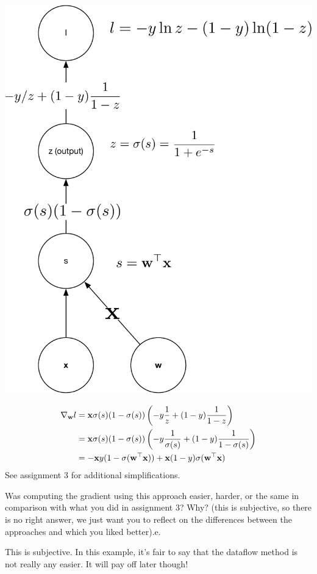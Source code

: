 \documentclass[assignment06_Solutions]{subfiles}
\begin{document}
\begin{exercise}[(30 minutes)]
\begin{boxedsolution}
\begin{center}
\includegraphics[width=0.8\linewidth]{figures/4bsolution}
\end{center}
\begin{align}
\nabla_{\mathbf{w}} l &= \mathbf{x} \sigma(s)(1-\sigma(s))\left(-y\frac{1}{z} + (1-y)\frac{1}{1-z}\right) \nonumber \\
&= \mathbf{x} \sigma(s)(1-\sigma(s))\left(-y\frac{1}{\sigma(s)} + (1-y)\frac{1}{1-\sigma(s)}\right) \nonumber \\
&= -\mathbf{x} y(1- \sigma(\mathbf{w}^\top \mathbf{x})) + \mathbf{x} (1-y) \sigma(\mathbf{w}^\top \mathbf{x})
\end{align}
See assignment 3 for additional simplifications.
\end{boxedsolution}
\item Was computing the gradient using this approach easier, harder, or the same in comparison with what you did in assignment 3?  Why? (this is subjective, so there is no right answer, we just want you to reflect on the differences between the approaches and which you liked better).e. 
\begin{boxedsolution}
This is subjective.  In this example, it's fair to say that the dataflow method is not really any easier.  It will pay off later though!
\end{boxedsolution}
\ees
\end{exercise}
\end{document}
